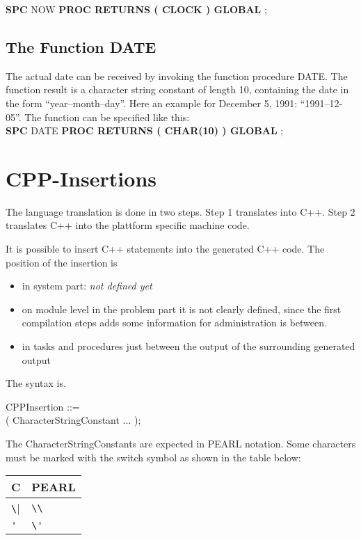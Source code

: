 {\bf SPC} NOW {\bf PROC RETURNS ( CLOCK ) GLOBAL} ; 


\subsection{The Function DATE}    %

The actual date can be received by invoking the function procedure DATE.
The function result is a character string constant of length 10, containing
the date in the form ``year--month--day''. Here an example for December 5,
1991: ``1991--12-05''. The function can be specified like this:\\

{\bf SPC} DATE {\bf PROC RETURNS ( CHAR(10) ) GLOBAL} ;

\section{CPP-Insertions}
The language translation is done in two steps.
Step 1 translates \OpenPEARL{} into C++.
Step 2 translates C++ into the plattform specific machine code.

It is possible to insert C++ statements into the generated C++ 
code. The position of the insertion is
\begin{discuss}
\begin{itemize}
\item in system part: {\em not defined yet}
\item on module level in the problem part 
   it is not clearly defined, since the first compilation
   steps adds some information for administration is between.
\item in tasks and procedures just between the output of the surrounding
generated output
\end{itemize}
\end{discuss}

The syntax is.

CPPInsertion ::=\\
 ( CharacterStringConstant ... );

The CharacterStringConstants are expected in PEARL notation.
Some characters must be marked with the switch symbol as shown in the table
below:

\begin{tabular}{l|l}
C & PEARL \\
\hline
\verb|\| & \verb|\\| \\
\verb|'| & \verb|\'|  \\
\end{tabular}

